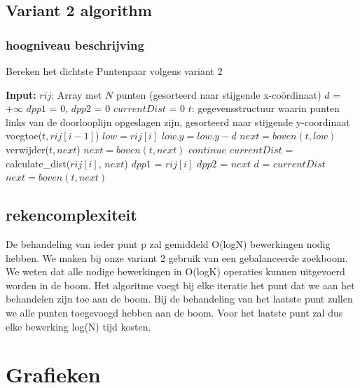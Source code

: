 \documentclass[12pt]{article}
\begin{document}
\subsection{Variant 2 algorithm}
\subsubsection{hoogniveau beschrijving}

\begin{algorithm}
\caption{Bereken het dichtste Puntenpaar volgens variant 2}
\begin{algorithmic}
	\STATE \textbf{Input:}  $rij$: Array met $N$ punten (gesorteerd naar stijgende x-co\"ordinaat)
	\STATE $d$ = $+\infty$
	\STATE $dpp1$ = 0, $dpp2$ = 0
	\STATE $currentDist$ = 0
	\STATE $t$: gegevensstructuur waarin punten links van de doorlooplijn opgeslagen zijn, gesorteerd naar stijgende y-coordinaat
    \STATE voegtoe($t, rij[i-1]$)
    \STATE $low = rij[i]$
    \STATE $low.y = low.y - d$
    \STATE $next = boven(t,low)$
        \STATE verwijder($t, next$)
        \STATE $next = boven(t,next)$
        \STATE $continue$
      \ENDIF
      \STATE $currentDist$ = calculate\_dist($rij[i]$, $next$)
  			\STATE $dpp1$ = $rij[i]$
  			\STATE $dpp2$ = $next$
  			\STATE $d$ = $currentDist$
  		\ENDIF
      \STATE $next = boven(t,next)$
    \ENDWHILE
  \ENDFOR
\end{algorithmic}
\end{algorithm}

\subsection{rekencomplexiteit}
De behandeling van ieder punt p zal gemiddeld O(logN) bewerkingen nodig hebben.
We maken bij onze variant 2 gebruik van een gebalanceerde zoekboom.
We weten dat alle nodige bewerkingen in O(logK) operaties kunnen uitgevoerd worden in de boom.
Het algoritme voegt bij elke iteratie het punt dat we aan het behandelen zijn toe aan de boom.
Bij de behandeling van het laatste punt zullen we alle punten toegevoegd hebben aan de boom.
Voor het laatste punt zal dus elke bewerking log(N) tijd kosten.



\section{Grafieken}
\end{document}
